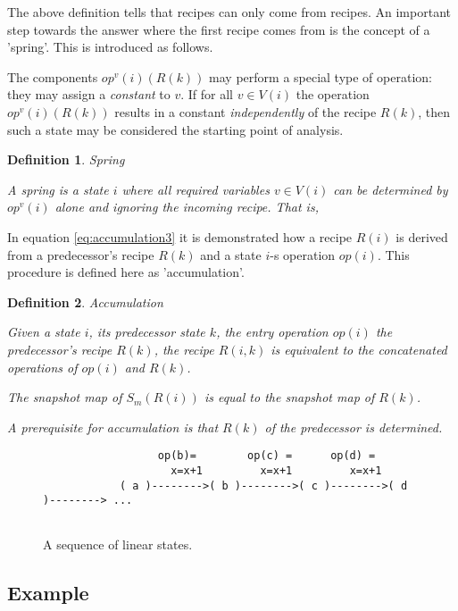 \documentclass[12pt,a4paper]{scrartcl}
\newtheorem{definition}{Definition}
\begin{document}
The above definition tells that recipes can only come from recipes. An
important step towards the answer where the first recipe comes from is the
concept of a 'spring'. This is introduced as follows. 

The components $op^v(i)(R(k))$ may perform a special type of operation: they
may assign a \textit{constant} to $v$. If for all $v\in V(i)$ the operation
$op^v(i)(R(k))$ results in a constant \textit{independently} of the recipe
$R(k)$, then such a state may be considered the starting point of analysis. 

\begin{definition}
Spring

A spring is a state $i$ where all required variables $v\in V(i)$ can be
determined by $op^v(i)$ alone and ignoring the incoming recipe. That is,
\end{definition}

In equation \eqref{eq:accumulation3} it is demonstrated how a recipe $R(i)$ is
derived from a predecessor's recipe $R(k)$ and a state $i$-s operation $op(i)$.
This procedure is defined here as 'accumulation'.

\begin{definition}
Accumulation

Given a state $i$, its predecessor state $k$, the entry operation $op(i)$
the predecessor's recipe $R(k)$, the recipe $R(i,k)$ is equivalent
to the concatenated operations of $op(i)$ and $R(k)$.

The snapshot map of $S_m(R(i))$ is equal to the snapshot map of $R(k)$.

A prerequisite for accumulation is that $R(k)$ of the predecessor is 
determined.
\end{definition}

\begin{figure}[htbp] \leavevmode
\begin{verbatim}
                  op(b)=        op(c) =      op(d) =
                    x=x+1         x=x+1         x=x+1        
            ( a )-------->( b )-------->( c )-------->( d )--------> ...


\end{verbatim}
\caption{A sequence of linear states.}
\end{figure}

\subsection{Example}
\end{document}
